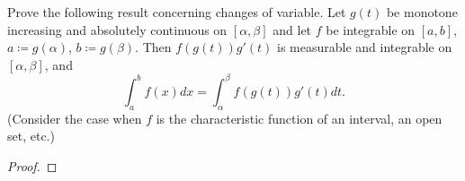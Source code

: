 \begin{problem}
Prove the following result concerning changes of variable. Let $g(t)$ be
monotone increasing and absolutely continuous on $[\alpha,\beta]$ and let $f$
be integrable on $[a,b]$, $a\coloneqq g(\alpha)$, $b\coloneqq
g(\beta)$. Then $f(g(t))g'(t)$ is measurable and integrable on
$[\alpha,\beta]$, and
\[
\int_a^b f(x)d x=\int_\alpha^\beta f(g(t))g'(t)d t.
\]
(Consider the case when $f$ is the characteristic function of an interval,
an open set, etc.)
\end{problem}
\begin{proof}
\end{proof}

